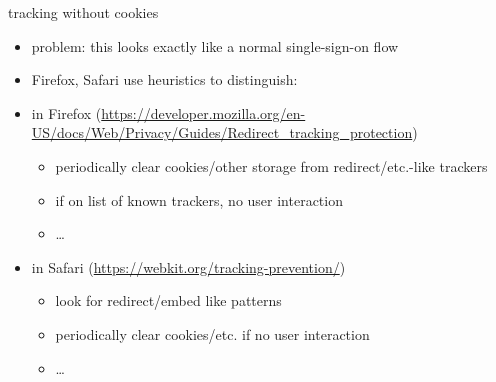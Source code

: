 \begin{frame}{tracking without cookies}
    \begin{itemize}
    \item problem: this looks exactly like a normal single-sign-on flow
    \vspace{.5cm}
    \item Firefox, Safari use heuristics to distinguish:
    \item in Firefox ({\scriptsize \url{https://developer.mozilla.org/en-US/docs/Web/Privacy/Guides/Redirect_tracking_protection}})
        \begin{itemize}
        \item periodically clear cookies/other storage from redirect/etc.-like trackers
        \item if on list of known trackers, no user interaction
        \item \ldots
        \end{itemize}
    \item in Safari ({\scriptsize \url{https://webkit.org/tracking-prevention/}})
        \begin{itemize}
        \item look for redirect/embed like patterns
        \item periodically clear cookies/etc. if no user interaction
        \item \ldots
        \end{itemize}
    \end{itemize}
\end{frame}
